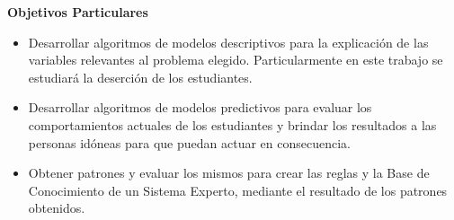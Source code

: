 
\textbf{Objetivos Particulares}
\begin{itemize}
	\item Desarrollar algoritmos de modelos descriptivos para la explicación de las variables relevantes al problema elegido. Particularmente en este trabajo se estudiará la deserción de los estudiantes.
	\item Desarrollar algoritmos de modelos predictivos para evaluar los comportamientos actuales de los estudiantes y brindar los resultados a las personas idóneas para que puedan actuar en consecuencia.
	\item Obtener patrones y evaluar los mismos para crear las reglas y la Base de Conocimiento de un Sistema Experto, mediante el resultado de los patrones obtenidos.
\end{itemize}


